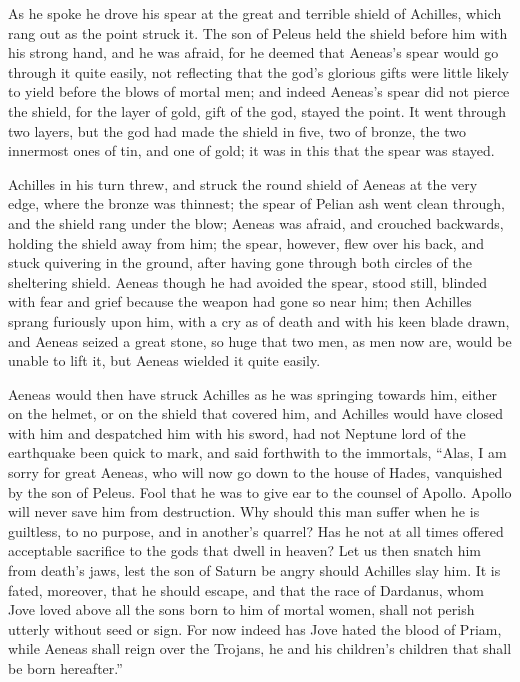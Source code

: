 As he spoke he drove his spear at the great and terrible shield of
Achilles, which rang out as the point struck it. The son of Peleus held
the shield before him with his strong hand, and he was afraid, for he
deemed that Aeneas’s spear would go through it quite easily, not
reflecting that the god’s glorious gifts were little likely to yield
before the blows of mortal men; and indeed Aeneas’s spear did not pierce
the shield, for the layer of gold, gift of the god, stayed the point. It
went through two layers, but the god had made the shield in five, two of
bronze, the two innermost ones of tin, and one of gold; it was in this
that the spear was stayed.

Achilles in his turn threw, and struck the round shield of Aeneas at the
very edge, where the bronze was thinnest; the spear of Pelian ash went
clean through, and the shield rang under the blow; Aeneas was afraid, and
crouched backwards, holding the shield away from him; the spear, however,
flew over his back, and stuck quivering in the ground, after having gone
through both circles of the sheltering shield. Aeneas though he had
avoided the spear, stood still, blinded with fear and grief because the
weapon had gone so near him; then Achilles sprang furiously upon him, with
a cry as of death and with his keen blade drawn, and Aeneas seized a great
stone, so huge that two men, as men now are, would be unable to lift it,
but Aeneas wielded it quite easily.

Aeneas would then have struck Achilles as he was springing towards him,
either on the helmet, or on the shield that covered him, and Achilles
would have closed with him and despatched him with his sword, had not
Neptune lord of the earthquake been quick to mark, and said forthwith to
the immortals, “Alas, I am sorry for great Aeneas, who will now go down to
the house of Hades, vanquished by the son of Peleus. Fool that he was to
give ear to the counsel of Apollo. Apollo will never save him from
destruction. Why should this man suffer when he is guiltless, to no
purpose, and in another’s quarrel? Has he not at all times offered
acceptable sacrifice to the gods that dwell in heaven? Let us then snatch
him from death’s jaws, lest the son of Saturn be angry should Achilles
slay him. It is fated, moreover, that he should escape, and that the race
of Dardanus, whom Jove loved above all the sons born to him of mortal
women, shall not perish utterly without seed or sign. For now indeed has
Jove hated the blood of Priam, while Aeneas shall reign over the Trojans,
he and his children’s children that shall be born hereafter.”

